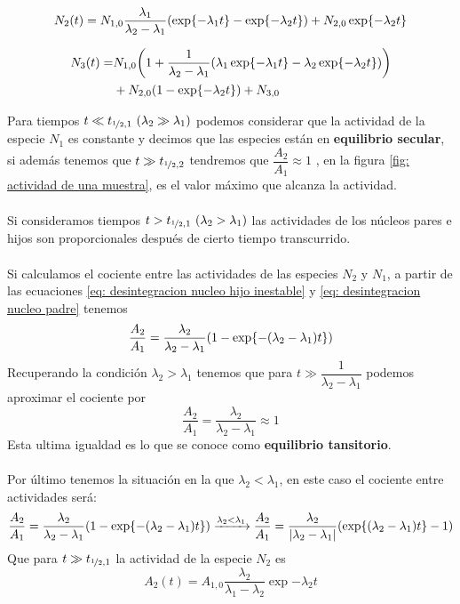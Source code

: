 \begin{equation}
    N_2(t) = N_{1,0} \frac{\lambda_1}{\lambda_2 - \lambda_1} 
    \qty(\exp{-\lambda_1 t} - \exp{-\lambda_2 t}) 
    + N_{2,0} \exp{-\lambda_2 t}
    \label{eq: desintegracion nucleo hijo inestable}
\end{equation}

\begin{equation}
    \begin{aligned}
        N_3(t) = & N_{1,0} \qty(1 + \frac{1}{\lambda_2 - \lambda_1}
        \qty(\lambda_1 \exp{-\lambda_1 t} - \lambda_2 \exp{-\lambda_2 t})) \\
        & + N_{2,0} \qty(1 - \exp{-\lambda_2 t}) + N_{3,0}
    \end{aligned}
    \label{eq: desintegracion nucleo nieto estable}
\end{equation}

Para tiempos $t\ll t_{\nicefrac{1}{2},1}\  (\lambda_2\gg \lambda_1)$ podemos considerar que la actividad de la especie $N_1$ es constante y decimos que las especies están en \textbf{equilibrio secular}, si además tenemos que $t\gg t_{\nicefrac{1}{2},2}$ tendremos que $\dfrac{A_2}{A_1} \approx 1$ , en la figura \ref{fig: actividad de una muestra}, es el valor máximo que alcanza la actividad. \\\\
Si consideramos tiempos  $t > t_{\nicefrac{1}{2},1}\  (\lambda_2> \lambda_1)$ las actividades de los núcleos pares e hijos son proporcionales después de cierto tiempo transcurrido.\\\\
Si calculamos el cociente entre las actividades de las especies $N_2$ y $N_1$, a partir de las ecuaciones \ref{eq: desintegracion nucleo hijo inestable} y \ref{eq: desintegracion nucleo padre} tenemos
\begin{equation*}
    \frac{A_2}{A_1}=\frac{\lambda_2}{\lambda_2-\lambda_1}\qty(1-\exp{-(\lambda_2-\lambda_1)t})
\end{equation*}
Recuperando la condición $\lambda_2 > \lambda_1$ tenemos que para $t\gg  \dfrac{1}{\lambda_2-\lambda_1}$ podemos aproximar el cociente por $$\frac{A_2}{A_1}=\frac{\lambda_2}{\lambda_2-\lambda_1}\approx 1$$
Esta ultima igualdad es lo que se conoce como \textbf{equilibrio tansitorio}. \\\\
Por último tenemos la situación en la que $\lambda_2<\lambda_1$, en este caso el cociente entre actividades será:
\begin{equation*}
    \frac{A_2}{A_1}=\frac{\lambda_2}{\lambda_2-\lambda_1}\qty(1-\exp{-(\lambda_2-\lambda_1)t}) \xrightarrow[]{\lambda_2<\lambda_1} \frac{A_2}{A_1}=\frac{\lambda_2}{\abs{\lambda_2-\lambda_1}}\qty(\exp{(\lambda_2-\lambda_1)t}-1)
\end{equation*}
Que para $t\gg t_{\nicefrac{1}{2},1}$ la actividad de la especie $N_2$ es 
\begin{equation*}
    A_2(t)=A_{1,0}\frac{\lambda_2}{\lambda_1-\lambda_2}\exp{-\lambda_2t}
\end{equation*}

